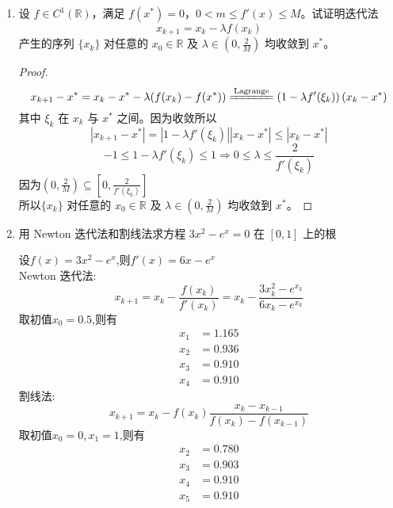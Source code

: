 \documentclass[a4paper]{article}
\begin{document}
\courseheader
{}

\begin{enumerate}
  \setlength{\itemsep}{4\parskip}

  \item 设 $f\in C^{1}(\mathbb{R})$，满足 $f(x^{*})=0$，$0<m\leqslant f'(x)\leqslant M$。试证明迭代法$$x_{k+1}=x_{k}-\lambda f(x_{k})$$产生的序列 $\{x_{k}\}$ 对任意的 $x_{0}\in\mathbb{R}$ 及 $\lambda\in(0,\frac{2}{M})$ 均收敛到 $x^{*}$。
  \begin{proof}
    \[
    x_{k+1}-x^{*}=x_{k}-x^{*}-\lambda(f(x_{k})-f(x^{*}))\xlongequal[]{\text{Lagrange}}\left(1-\lambda f'(\xi_{k})\right)(x_{k}-x^{*})
    \]
    其中 $\xi_{k}$ 在 $x_{k}$ 与 $x^{*}$ 之间。因为收敛所以
    \[
    |x_{k+1}-x^{*}|=|1-\lambda f'(\xi_{k})||x_{k}-x^{*}|\le |x_{k}-x^{*}|
    \]
    \[
    -1\le 1-\lambda f'(\xi_{k})\le 1 \Rightarrow 0\le \lambda \le \frac{2}{f'(\xi_{k})}
    \]
    因为$(0,\frac{2}{M})\subseteq [0,\frac{2}{f'(\xi_{k})}]$\\
    所以$\{x_{k}\}$ 对任意的 $x_{0}\in\mathbb{R}$ 及 $\lambda\in(0,\frac{2}{M})$ 均收敛到 $x^{*}$。
  \end{proof}

  \item 用 Newton 迭代法和割线法求方程 $3x^{2}-e^{x}=0$ 在 $[0,1]$ 上的根
  \begin{solution}
    设$f(x)=3x^{2}-e^{x}$,则$f'(x)=6x-e^{x}$\\
    Newton 迭代法:
    \[
    x_{k+1}=x_{k}-\frac{f(x_{k})}{f'(x_{k})}=x_{k}-\frac{3x_{k}^{2}-e^{x_{k}}}{6x_{k}-e^{x_{k}}}
    \]
    取初值$x_{0}=0.5$,则有
    \begin{align*}
      x_{1}&=1.165\\
      x_{2}&=0.936\\
      x_{3}&=0.910\\
      x_{4}&=0.910
    \end{align*}
    割线法:
    \[
    x_{k+1}=x_{k}-f(x_{k})\frac{x_{k}-x_{k-1}}{f(x_{k})-f(x_{k-1})}
    \]
    取初值$x_{0}=0,x_{1}=1$,则有
    \begin{align*}
      x_{2}&=0.780\\
      x_{3}&=0.903\\
      x_{4}&=0.910\\
      x_{5}&=0.910
    \end{align*}
  \end{solution}


\end{enumerate}
\end{document}
